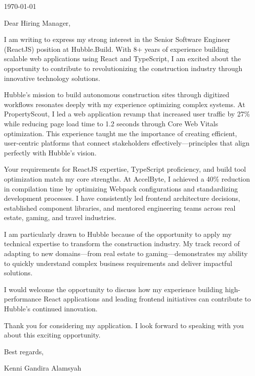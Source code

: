 \documentclass[a4paper, 11pt]{article}
\newcommand{\link}[2]{{\color[HTML]{096dd9}\href[pdfnewwindow=true]{#1}{#2}}}
\begin{document}

\vspace{10pt}

\today

\vspace{10pt}

Dear Hiring Manager,

I am writing to express my strong interest in the Senior Software Engineer (ReactJS) position at Hubble.Build. With 8+ years of experience building scalable web applications using React and TypeScript, I am excited about the opportunity to contribute to revolutionizing the construction industry through innovative technology solutions.

Hubble's mission to build autonomous construction sites through digitized workflows resonates deeply with my experience optimizing complex systems. At PropertyScout, I led a web application revamp that increased user traffic by 27\% while reducing page load time to 1.2 seconds through Core Web Vitals optimization. This experience taught me the importance of creating efficient, user-centric platforms that connect stakeholders effectively—principles that align perfectly with Hubble's vision.

Your requirements for ReactJS expertise, TypeScript proficiency, and build tool optimization match my core strengths. At AccelByte, I achieved a 40\% reduction in compilation time by optimizing Webpack configurations and standardizing development processes. I have consistently led frontend architecture decisions, established component libraries, and mentored engineering teams across real estate, gaming, and travel industries.

I am particularly drawn to Hubble because of the opportunity to apply my technical expertise to transform the construction industry. My track record of adapting to new domains—from real estate to gaming—demonstrates my ability to quickly understand complex business requirements and deliver impactful solutions.

I would welcome the opportunity to discuss how my experience building high-performance React applications and leading frontend initiatives can contribute to Hubble's continued innovation.

Thank you for considering my application. I look forward to speaking with you about this exciting opportunity.

\vspace{10pt}

Best regards,

Kenni Gandira Alamsyah
\end{document}
